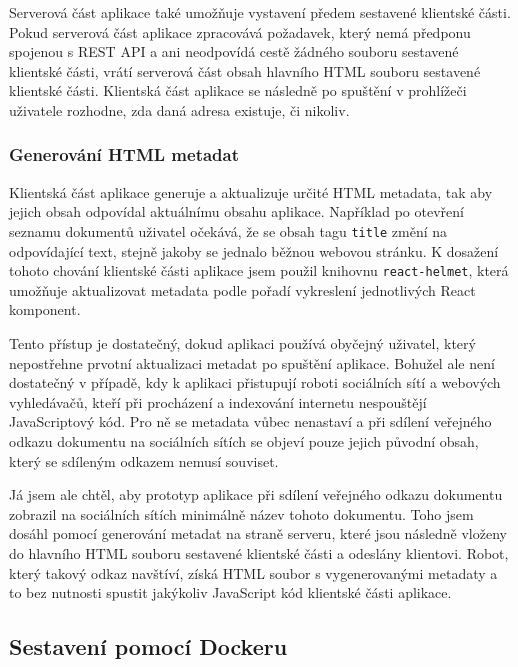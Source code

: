 Serverová část aplikace také umožňuje vystavení předem sestavené klientské části.
Pokud serverová část aplikace zpracovává požadavek, který nemá předponu spojenou s \gls{REST} \gls{API} a ani neodpovídá cestě žádného souboru sestavené klientské části, vrátí serverová část obsah hlavního \gls{HTML} souboru sestavené klientské části.
Klientská část aplikace se následně po spuštění v prohlížeči uživatele rozhodne, zda daná adresa existuje, či nikoliv.

\subsubsection{Generování HTML metadat}

Klientská část aplikace generuje a aktualizuje určité \gls{HTML} metadata, tak aby jejich obsah odpovídal aktuálnímu obsahu aplikace.
Například po otevření seznamu dokumentů uživatel očekává, že se obsah tagu \texttt{title} změní na odpovídající text, stejně jakoby se jednalo běžnou webovou stránku.
K dosažení tohoto chování klientské části aplikace jsem použil knihovnu \texttt{react-helmet}, která umožňuje aktualizovat metadata podle pořadí vykreslení jednotlivých React komponent.

Tento přístup je dostatečný, dokud aplikaci používá obyčejný uživatel, který nepostřehne prvotní aktualizaci metadat po spuštění aplikace.
Bohužel ale není dostatečný v případě, kdy k aplikaci přistupují roboti sociálních sítí a webových vyhledávačů, kteří při procházení a indexování internetu nespouštějí JavaScriptový kód.
Pro ně se metadata vůbec nenastaví a při sdílení veřejného odkazu dokumentu na sociálních sítích se objeví pouze jejich původní obsah, který se sdíleným odkazem nemusí souviset.

Já jsem ale chtěl, aby prototyp aplikace při sdílení veřejného odkazu dokumentu zobrazil na sociálních sítích minimálně název tohoto dokumentu.
Toho jsem dosáhl pomocí generování metadat na straně serveru, které jsou následně vloženy do hlavního \gls{HTML} souboru sestavené klientské části a odeslány klientovi.
Robot, který takový odkaz navštíví, získá \gls{HTML} soubor s vygenerovanými metadaty a to bez nutnosti spustit jakýkoliv JavaScript kód klientské části aplikace.

\subsection{Sestavení pomocí Dockeru}\label{subsec:sestaveníPomocíDockeru}

